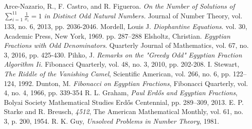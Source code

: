 \documentclass[paper=a4, fontsize=11pt]{scrartcl}
\numberwithin{equation}{section}	 %
\numberwithin{figure}{section}	 %
\numberwithin{table}{section}	 %
\begin{document}
\begin{thebibliography}{9}
	Arce-Nazario, R., F. Castro, and R. Figueroa.
	\textit{On the Number of Solutions of} \:\:$\sum_{i=1}^{11} \frac{1}{x_i} = 1$ \textit{in Distinct Odd Natural Numbers.}
	Journal of Number Theory, vol. 133, no. 6, 2013, pp. 2036-2046.
	Mordell, Louis J.
	\textit{Diophantine Equations}.
	vol. 30, Academic Press, New York, 1969. pp. 287–288
	Elsholtz, Christian.
	\textit{Egyptian Fractions with Odd Denominators}.
	Quarterly Journal of Mathematics, vol. 67, no. 3, 2016, pp. 425-430.
	Pihko, J.
	\textit{Remarks on the "Greedy Odd" Egyptian Fraction Algorithm Ii.}
	Fibonacci Quarterly, vol. 48, no. 3, 2010, pp. 202-208.
	I. Stewart,
	\textit{The Riddle of the Vanishing Camel},
	Scientific American, vol. 266, no. 6, pp. 122–124, 1992.
	Dunton, M.
	\textit{Fibonacci on Egyptian Fractions},
	Fibonacci Quarterly, vol. 4, no. 4, 1966, pp. 339-354
	R. L. Graham,
	\textit{Paul Erd\H{o}s and Egyptian Fractions},
	Bolyai Society Mathematical Studies Erd\H{o}s Centennial, pp. 289–309, 2013.
	E. P. Starke and R. Breusch,
	\textit{4512},
	The American Mathematical Monthly, vol. 61, no. 3, p. 200, 1954.
	R. K. Guy,
	\textit{Unsolved Problems in Number Theory},
	1981.
	
\end{thebibliography}

%
%

\end{document}
